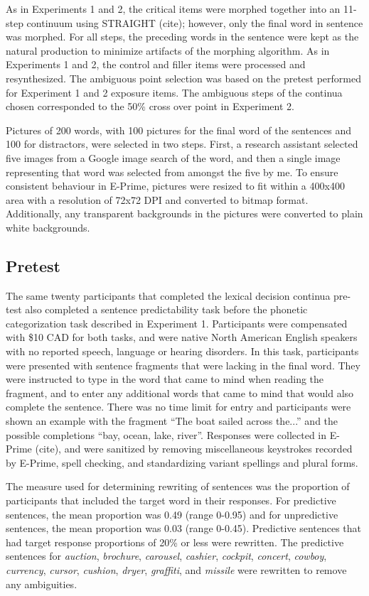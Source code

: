 As in Experiments 1 and 2, the critical items were morphed together into an 11-step continuum using STRAIGHT (cite); however, only the final word in sentence was morphed.  For all steps, the preceding words in the sentence were kept as the natural production to minimize artifacts of the morphing algorithm.  As in Experiments 1 and 2, the control and filler items were processed and resynthesized.  The ambiguous point selection was based on the pretest performed for Experiment 1 and 2 exposure items.  The ambiguous steps of the continua chosen corresponded to the 50\% cross over point in Experiment 2.

Pictures of 200 words, with 100 pictures for the final word of the sentences and 100 for distractors, were selected in two steps.  First, a research assistant selected five images from a Google image search of the word, and then a single image representing that word was selected from amongst the five by me.  To ensure consistent behaviour in E-Prime, pictures were resized to fit within a 400x400 area with a resolution of 72x72 DPI and converted to bitmap format.  Additionally, any transparent backgrounds in the pictures were converted to plain white backgrounds.

\subsection{Pretest}

The same twenty participants that completed the lexical decision continua pre-test also completed a sentence predictability task before the phonetic categorization task described in Experiment 1. Participants were compensated with \$10 CAD for both tasks, and were native North American English speakers with no reported speech, language or hearing disorders. In this task, participants were presented with sentence fragments that were lacking in the final word.  They were instructed to type in the word that came to mind when reading the fragment, and to enter any additional words that came to mind that would also complete the sentence.  There was no time limit for entry and participants were shown an example with the fragment ``The boat sailed across the...'' and the possible completions ``bay, ocean, lake, river''.  Responses were collected in E-Prime (cite), and were sanitized by removing miscellaneous keystrokes recorded by E-Prime, spell checking, and standardizing variant spellings and plural forms.

The measure used for determining rewriting of sentences was the proportion of participants that included the target word in their responses.  For predictive sentences, the mean proportion was 0.49 (range 0-0.95) and for unpredictive sentences, the mean proportion was 0.03 (range 0-0.45).  Predictive sentences that had target response proportions of 20\% or less were rewritten.  The predictive sentences for \emph{auction}, \emph{brochure}, \emph{carousel}, \emph{cashier}, \emph{cockpit}, \emph{concert}, \emph{cowboy}, \emph{currency}, \emph{cursor}, \emph{cushion}, \emph{dryer}, \emph{graffiti}, and \emph{missile} were rewritten to remove any ambiguities.  

